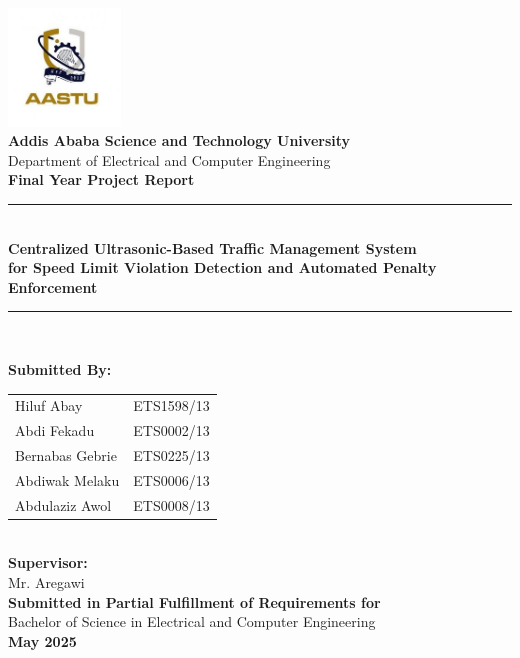 \begin{titlepage}
    \centering
    
    \includegraphics[width=3cm]{logo.jpg}\\[0.5cm]
    
    {\large \textbf{Addis Ababa Science and Technology University}}\\
    {\large Department of Electrical and Computer Engineering}\\[0.5cm]
    
    {\Large \textbf{Final Year Project Report}}\\[0.5cm]
    \rule{\textwidth}{1.5pt}\\[0.2cm]
    {\LARGE \textbf{Centralized Ultrasonic-Based Traffic Management System}}\\[0.2cm]
    {\LARGE\textbf{for Speed Limit Violation Detection and Automated Penalty Enforcement}}\\[0.2cm]
    \rule{\textwidth}{1.5pt}\\[1cm]
    
    \begin{minipage}{0.9\textwidth}
        \centering
        \textbf{Submitted By:}\\[0.2cm]
        \large
        \begin{tabular}{ll}
            Hiluf Abay & ETS1598/13 \\
            Abdi Fekadu & ETS0002/13 \\
            Bernabas Gebrie & ETS0225/13 \\
            Abdiwak Melaku & ETS0006/13 \\
            Abdulaziz Awol & ETS0008/13 \\
        \end{tabular}
    \end{minipage}\\[1cm]
    
    \textbf{Supervisor:}\\[0.2cm]
    \large Mr. Aregawi\\[0.5cm]
    
    \textbf{Submitted in Partial Fulfillment of Requirements for}\\[0.2cm]
    \large Bachelor of Science in Electrical and Computer Engineering\\[0.5cm]
    
    {\large \textbf{May 2025}}
    
    \vfill
\end{titlepage}
